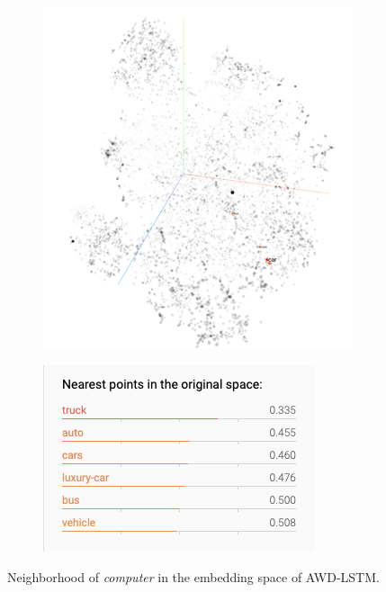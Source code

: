 \begin{figure}
\centering
\begin{subfigure}{.5\textwidth}
  \centering
  \includegraphics[width=\linewidth]{figures/car_emb_neighbor.png}
  \label{figure:computer:neighborhood}
\end{subfigure}%
\begin{subfigure}{.5\textwidth}
  \centering
  \includegraphics[width=\linewidth]{figures/car_nearest_neighbors.png}
  \label{figure:computer:neighbor}
\end{subfigure}
\caption{Neighborhood of \emph{computer} in the embedding space of AWD-LSTM.}
\label{figure:computer}
\end{figure}

